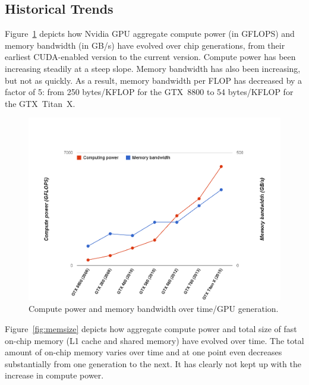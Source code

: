 \subsection{Historical Trends}  \label{GPUArchTrends}

Figure~\ref{fig:compute-power} depicts how Nvidia GPU aggregate compute power (in GFLOPS) and memory
bandwidth (in GB/s) have evolved over chip generations, from their earliest CUDA-enabled version to the current
version.
Compute power has been increasing steadily at a steep slope.
Memory bandwidth has also been increasing, but not as quickly.
As a result, memory bandwidth per FLOP has decreased by a factor of 5: from 250 bytes/KFLOP for the GTX~8800 to
54 bytes/KFLOP for the GTX~Titan~X.

\begin{figure}
\center
\includegraphics[scale=0.26]{computevsmemory.png}
\caption{\footnotesize\textnormal{Compute power and memory bandwidth over time/GPU generation.}}
\label{fig:compute-power}
\end{figure}

Figure~\ref{fig:memsize} depicts how aggregate compute power and total size of fast on-chip memory (L1 cache and shared memory) have evolved over time.
The total amount of on-chip memory varies over time and at one point even decreases substantially from one generation to the next.
It has clearly not kept up with the increase in compute power. 

